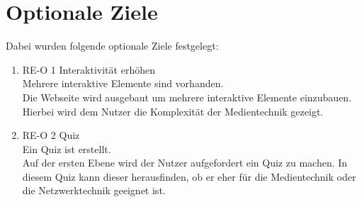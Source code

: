 \section{Optionale Ziele}
Dabei wurden folgende optionale Ziele festgelegt:
\begin{enumerate}
\item RE-O 1 Interaktivität erhöhen \\
Mehrere interaktive Elemente sind vorhanden.\\
Die Webseite wird ausgebaut um mehrere interaktive Elemente einzubauen. Hierbei wird dem Nutzer die Komplexität der Medientechnik gezeigt.
\item RE-O 2 Quiz\\
Ein Quiz ist erstellt.\\
Auf der ersten Ebene wird der Nutzer aufgefordert ein Quiz zu machen. In diesem Quiz kann dieser herausfinden, ob er eher für die Medientechnik oder die Netzwerktechnik geeignet ist.
\end{enumerate}
